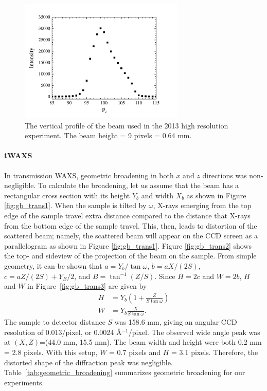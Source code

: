 \begin{figure}[htbp]
  \centering
  \includegraphics[width=0.7\textwidth]{figures/ripple/MMs/waxs/beamz_hr}
  \caption{The vertical profile of the beam used in the 2013 high resolution experiment.
  The beam height = 9 pixels = 0.64 mm.}
  \label{fig:nGIWAXS_beamz}
\end{figure} 

\paragraph{tWAXS}
In transmission WAXS, 
geometric broadening in both $x$ and $z$ directions was non-negligible.
To calculate the broadening, let us assume that the beam has a rectangular
cross section with its height $Y_b$ and width $X_b$ as shown in Figure 
\ref{fig:gb_trans1}. When the sample is tilted by $\omega$, X-rays emerging 
from the top edge of the sample travel extra distance compared to the distance 
that X-rays from the bottom edge of the sample travel. This, then, leads to 
distortion of the scattered beam; namely, the scattered beam will appear on 
the CCD screen as a parallelogram as shown in Figure 
\ref{fig:gb_trans1}. 
Figure \ref{fig:gb_trans2} shows the top- and sideview of the 
projection of the beam on the sample. From simple geometry, it can be shown 
that $a=Y_b/\tan\omega$, $b=aX/(2S)$, $c=aZ/(2S)+Y_B/2$, and $B=\tan^{-1}(Z/S)$. 
Since $H=2c$ and $W=2b$, $H$ and $W$ in Figure~\ref{fig:gb_trans3} are 
given by
\begin{align}
	H &= Y_b\left(1+\frac{Z}{S\tan\omega}\right)\\
	W &= Y_b\frac{X}{S\tan\omega}.
\end{align}
The sample to detector distance $S$ was 158.6 mm, giving an angular
CCD resolution of 0.013\textdegree/pixel, 
or 0.0024 \AA$^{-1}$/pixel.
The observed wide angle peak was at $(X,Z)$=(44.0 mm, 15.5 mm). 
The beam width and height were both 0.2 mm = 2.8 pixels.
With this setup, $W$ = 0.7 pixels and $H$ = 3.1 pixels. 
Therefore, the distorted shape of the diffraction peak was negligible.
Table~\ref{tab:geometric_broadening} summarizes geometric broadening for
our experiments.

